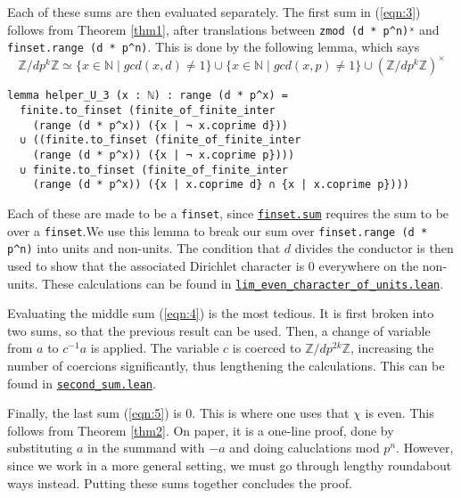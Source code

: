 \documentclass[a4paper,UKenglish,cleveref, autoref, thm-restate,pdfa]{lipics-v2021}
\newcommand{\lean}[1]{\texttt{#1}\xspace} %
\begin{document}
Each of these sums are then evaluated separately. The first sum in (\ref{eqn:3}) follows from Theorem \ref{thm1}, after translations between \lean{zmod (d * p\textasciicircum n)ˣ} and \lean{finset.range (d * p\textasciicircum n)}. 
This is done by the following lemma, which says 
$$ \mathbb{Z} / d p^k \mathbb{Z} \simeq \{ x \in \mathbb{N} \mid gcd (x, d) \ne 1 \} \cup \{ x \in \mathbb{N} \mid gcd (x, p) \ne 1 \} 
\cup (\mathbb{Z} / d p^k \mathbb{Z})^{\times} $$ 
\begin{lstlisting}
lemma helper_U_3 (x : ℕ) : range (d * p^x) = 
  finite.to_finset (finite_of_finite_inter 
    (range (d * p^x)) ({x | ¬ x.coprime d})) 
  ∪ ((finite.to_finset (finite_of_finite_inter 
    (range (d * p^x)) ({x | ¬ x.coprime p}))) 
  ∪ finite.to_finset (finite_of_finite_inter 
    (range (d * p^x)) ({x | x.coprime d} ∩ {x | x.coprime p}))) 
\end{lstlisting}
Each of these are made to be a \lean{finset}, since \href{https://leanprover-community.github.io/mathlib_docs/algebra/big_operators/basic.html#finset.sum}{\lean{finset.sum}} 
requires the sum to be over a \lean{finset}.We use this lemma to break our sum over \lean{finset.range (d * p\textasciicircum n)} into units and non-units. 
The condition that $d$ divides the conductor is then used to show that the associated Dirichlet character is 0 everywhere on the non-units. 
These calculations can be found in \href{https://github.com/laughinggas/p-adic-L-functions/blob/main/src/general_bernoulli_number/lim_even_character_of_units.lean}{\lean{lim\_even\_character\_of\_units.lean}}.

Evaluating the middle sum (\ref{eqn:4}) is the most tedious. It is first broken into two sums, so that the previous result can be used. Then, a 
change of variable from $a$ to $c^{-1} a$ is applied. The variable $c$ is coerced to $\mathbb{Z}/ d p^{2k} \mathbb{Z}$, increasing 
the number of coercions significantly, thus lengthening the calculations. This can be found in \href{https://github.com/laughinggas/p-adic-L-functions/blob/main/src/sum_eval/second_sum.lean}{\lean{second\_sum.lean}}.

Finally, the last sum (\ref{eqn:5}) is 0. This is where one uses that $\chi$ is even. This follows from Theorem \ref{thm2}. 
On paper, it is a one-line proof, done by substituting $a$ in the summand with $-a$ and doing caluclations mod $p^n$. However, since we work in a more general setting, 
we must go through lengthy roundabout ways instead. 
\newline Putting these sums together concludes the proof.
\end{document}
